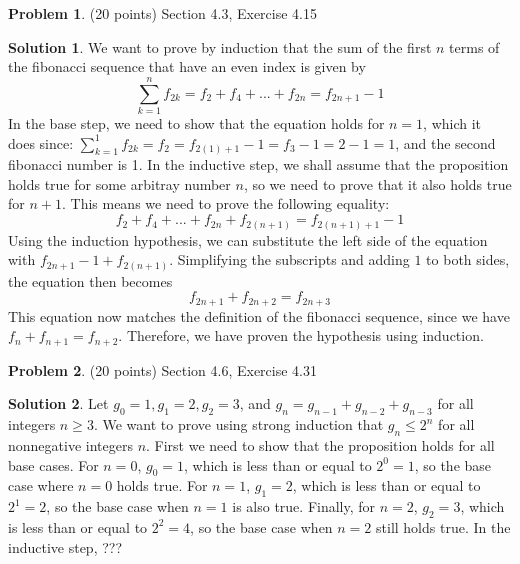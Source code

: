 \documentclass{article}
\theoremstyle{definition}
\newtheorem{problem}{Problem}
\newtheorem*{solution}{Solution}
\begin{document}
\newpage
\begin{problem} (20 points) Section 4.3, Exercise 4.15
\end{problem}
\begin{solution} 
We want to prove by induction that the sum of the first $n$ terms of the fibonacci sequence that have an even index is given by \[\sum_{k=1}^{n} f_{2k} = f_{2} + f_{4} + ... + f_{2n} = f_{2n+1} - 1\]
In the base step, we need to show that the equation holds for $n=1$, which it does since: $\sum_{k=1}^{1} f_{2k} = f_{2} = f_{2(1)+1} - 1 = f_{3} - 1 = 2 - 1 = 1$, and the second fibonacci number is 1.
In the inductive step, we shall assume that the proposition holds true for some arbitray number $n$, so we need to prove that it also holds true for $n+1$.
This means we need to prove the following equality: \[f_{2} + f_{4} + ... + f_{2n} + f_{2(n+1)} = f_{2(n+1)+1} - 1\]
Using the induction hypothesis, we can substitute the left side of the equation with $f_{2n+1} - 1 + f_{2(n+1)}$.
Simplifying the subscripts and adding $1$ to both sides, the equation then becomes \[f_{2n+1}+f_{2n+2} = f_{2n+3}\]
This equation now matches the definition of the fibonacci sequence, since we have $f_{n}+f_{n+1}=f_{n+2}$.
Therefore, we have proven the hypothesis using induction.

\end{solution}

\newpage
\begin{problem} (20 points) Section 4.6, Exercise 4.31
\end{problem}
\begin{solution} 
Let $g_{0}=1, g_{1}=2, g_{2}=3$, and $g_{n}=g_{n-1} + g_{n-2} + g_{n-3}$ for all integers $n\ge3$.
We want to prove using strong induction that $g_{n}\le2^{n}$ for all nonnegative integers $n$.
First we need to show that the proposition holds for all base cases.
For $n=0$, $g_{0}=1$, which is less than or equal to $2^{0}=1$, so the base case where $n=0$ holds true.
For $n=1$, $g_{1}=2$, which is less than or equal to $2^{1}=2$, so the base case when $n=1$ is also true.
Finally, for $n=2$, $g_{2}=3$, which is less than or equal to $2^{2}=4$, so the base case when $n=2$ still holds true.
In the inductive step, ???

\end{solution}
\end{document}
